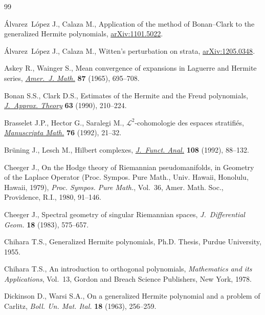 \documentclass[pdftex]{sigma}
\begin{document}
\begin{thebibliography}{99}
\footnotesize\itemsep=0pt

\'Alvarez~L\'opez J., Calaza M., Application of the method of Bonan--Clark to
  the generalized Hermite polynomials, \href{http://arxiv.org/abs/1101.5022}{arXiv:1101.5022}.

\'Alvarez~L\'opez J., Calaza M., Witten's perturbation on strata,
  \href{http://arxiv.org/abs/1205.0348}{arXiv:1205.0348}.

Askey R., Wainger S., Mean convergence of expansions in {L}aguerre and
  {H}ermite series, \href{http://dx.doi.org/10.2307/2373069}{\textit{Amer.~J. Math.}} \textbf{87} (1965), 695--708.

Bonan S.S., Clark D.S., Estimates of the {H}ermite and the {F}reud polynomials,
  \href{http://dx.doi.org/10.1016/0021-9045(90)90104-X}{\textit{J.~Approx. Theory}} \textbf{63} (1990), 210--224.

Brasselet J.P., Hector G., Saralegi M., {${\mathcal L}^2$}-cohomologie des
  espaces stratif\/i\'es, \href{http://dx.doi.org/10.1007/BF02567744}{\textit{Manuscripta Math.}} \textbf{76} (1992), 21--32.

Br{\"u}ning J., Lesch M., Hilbert complexes, \href{http://dx.doi.org/10.1016/0022-1236(92)90147-B}{\textit{J.~Funct. Anal.}}
  \textbf{108} (1992), 88--132.

Cheeger J., On the {H}odge theory of {R}iemannian pseudomanifolds, in Geometry
  of the {L}aplace Operator ({P}roc. {S}ympos. {P}ure {M}ath., {U}niv.
  {H}awaii, {H}onolulu, {H}awaii, 1979), \textit{Proc. Sympos. Pure Math.},
  Vol.~36, Amer. Math. Soc., Providence, R.I., 1980, 91--146.

Cheeger J., Spectral geometry of singular {R}iemannian spaces,
  \textit{J.~Differential Geom.} \textbf{18} (1983), 575--657.

Chihara T.S., Generalized Hermite polynomials, Ph.D. Thesis, Purdue University,
  1955.

Chihara T.S., An introduction to orthogonal polynomials, \textit{Mathematics
  and its Applications}, Vol.~13, Gordon and Breach Science Publishers, New
  York, 1978.

Dickinson D., Warsi S.A., On a generalized {H}ermite polynomial and a problem
  of {C}arlitz, \textit{Boll. Un. Mat. Ital.} \textbf{18} (1963), 256--259.


\end{thebibliography}
\end{document}
